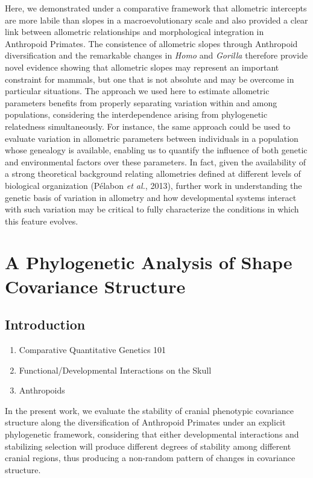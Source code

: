\documentclass[12pt,twoside]{report}
\begin{document}
Here, we demonstrated under a comparative framework that allometric
intercepts are more labile than slopes in a macroevolutionary scale and
also provided a clear link between allometric relationships and
morphological integration in Anthropoid Primates. The consistence of
allometric slopes through Anthropoid diversification and the remarkable
changes in \emph{Homo} and \emph{Gorilla} therefore provide novel
evidence showing that allometric slopes may represent an important
constraint for mammals, but one that is not absolute and may be overcome
in particular situations. The approach we used here to estimate
allometric parameters benefits from properly separating variation within
and among populations, considering the interdependence arising from
phylogenetic relatedness simultaneously. For instance, the same approach
could be used to evaluate variation in allometric parameters between
individuals in a population whose genealogy is available, enabling us to
quantify the influence of both genetic and environmental factors over
these parameters. In fact, given the availability of a strong
theoretical background relating allometries defined at different levels
of biological organization (Pélabon \emph{et al.}, 2013), further work
in understanding the genetic basis of variation in allometry and how
developmental systems interact with such variation may be critical to
fully characterize the conditions in which this feature evolves.

\newpage
\chapter{A Phylogenetic Analysis of Shape Covariance Structure}
\label{ch:ppca}

\section{Introduction}\label{introduction-2}

\begin{enumerate}
\def\labelenumi{\arabic{enumi}.}
\item
  Comparative Quantitative Genetics 101
\item
  Functional/Developmental Interactions on the Skull
\item
  Anthropoids
\end{enumerate}

In the present work, we evaluate the stability of cranial phenotypic
covariance structure along the diversification of Anthropoid Primates
under an explicit phylogenetic framework, considering that either
developmental interactions and stabilizing selection will produce
different degrees of stability among different cranial regions, thus
producing a non-random pattern of changes in covariance structure.
\end{document}
